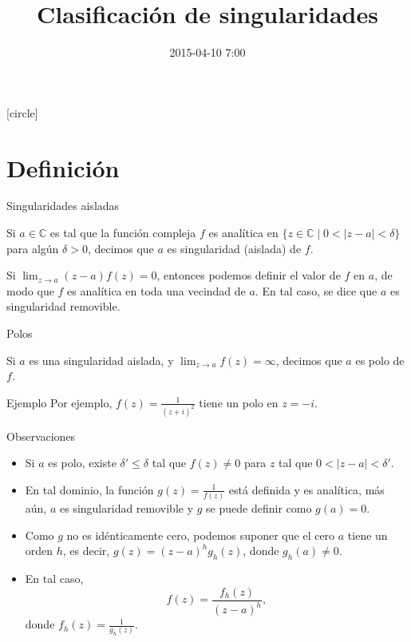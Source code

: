 \documentclass[spanish,presentation]{beamer}
\date{2015-04-10 7:00}
\title{Clasificación de singularidades}
\begin{document}
\maketitle
{}
[circle]

\tableofcontents

\section{Definición}
\label{sec-1}

\begin{frame}[label=sec-1-1]{Singularidades aisladas}
\begin{definition}[Singularidad]
Si \(a\in \mathbb{C}\) es tal que la función compleja \(f\) es
analítica en \(\{z\in \mathbb{C}\mid 0<|z-a|<\delta\}\) para algún
\(\delta>0\), decimos que \(a\) es \alert{singularidad (aislada)} de
\(f\).
\end{definition}

\begin{block}{}
Si \(\lim_{z\to a}(z-a)f(z)=0\), entonces podemos definir el valor
de \(f\) en \(a\), de modo que \(f\) es analítica en toda una
vecindad de \(a\). En tal caso, se dice que \(a\) es \alert{singularidad
removible}. 
\end{block}
\end{frame}

\begin{frame}[label=sec-1-2]{Polos}
\begin{definition}[Polo]
Si \(a\) es una singularidad aislada, y \(\lim_{z\to
    a}f(z)=\infty\), decimos que \(a\) es \alert{polo} de \(f\).
\end{definition}

\begin{exampleblock}{Ejemplo}
Por ejemplo, \(f(z)=\frac{1}{(z+i)^{2}}\) tiene un polo en
\(z=-i\). 
\end{exampleblock}
\end{frame}

\begin{frame}[label=sec-1-3]{}
\begin{block}{Observaciones}
\begin{itemize}
\item Si \(a\) es polo, existe \(\delta'\leq\delta\) tal que \(f(z)\ne
      0\) para \(z\) tal que \(0<|z-a|<\delta'\).
\item En tal dominio, la función \(g(z)=\frac{1}{f(z)}\) está definida
y es analítica, más aún, \(a\) es singularidad removible y \(g\)
se puede definir como \(g(a)=0\).
\item Como \(g\) no es idénticamente cero, podemos suponer que el cero
\(a\) tiene un orden \(h\), es decir,
\(g(z)=(z-a)^{h}g_{h}(z)\), donde \(g_{h}(a)\ne 0\).
\item En tal caso, 
\begin{displaymath}
f(z)=\frac{f_{h}(z)}{(z-a)^{h}},
\end{displaymath}
donde \(f_{h}(z)=\frac{1}{g_{h}(z)}\).
\end{itemize}
\end{block}
\end{frame}
\end{document}
